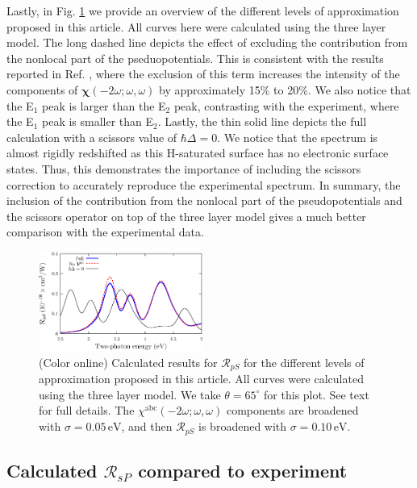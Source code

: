 Lastly, in Fig. \ref{fig:improvements} we provide an overview of the different
levels of approximation proposed in this article. All curves here were
calculated using the three layer model. The long dashed line depicts the effect
of excluding the contribution from the nonlocal part of the pseduopotentials.
This is consistent with the results reported in Ref. \cite{andersonPRB15},
where the exclusion of this term increases the intensity of the components of
$\boldsymbol{\chi}(-2\omega;\omega,\omega)$ by approximately 15\% to 20\%. We
also notice that the E$_{1}$ peak is larger than the E$_{2}$ peak, contrasting
with the experiment, where the E$_{1}$ peak is smaller than E$_{2}$. Lastly, the
thin solid line depicts the full calculation with a scissors value of
$\hbar\Delta = 0$. We notice that the spectrum is almost rigidly redshifted as
this H-saturated surface has no electronic surface states.\cite{andersonPRB15}
Thus, this demonstrates the importance of including the scissors correction to
accurately reproduce the experimental spectrum. In summary, the inclusion of the
contribution from the nonlocal part of the pseudopotentials and the scissors
operator on top of the three layer model gives a much better comparison with the
experimental data.

\begin{figure}[b]
\centering
\includegraphics[width=0.48\textwidth]{figures/03-results/shgyield/fig5}
\caption{(Color online) Calculated results for $\mathcal{R}_{pS}$ for the
different levels of approximation proposed in this article. All curves were
calculated using the three layer model. We take $\theta=65^{\circ}$ for this
plot. See text for full details. The
$\chi^{\mathrm{abc}}(-2\omega;\omega,\omega)$ components are broadened with
$\sigma=0.05\,\text{eV}$, and then $\mathcal{R}_{pS}$ is broadened with
$\sigma=0.10\,\text{eV}$.
\label{fig:improvements}}
\end{figure}


\subsection{Calculated \texorpdfstring{$\mathcal{R}_{sP}$}{RsP} compared to
experiment}\label{sec:RsP}

